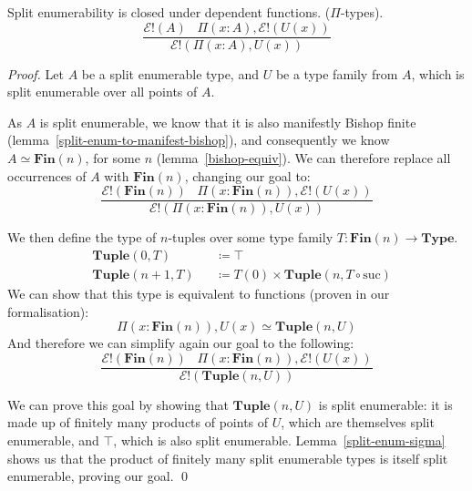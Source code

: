 \begin{romlemma}
  Split enumerability is closed under dependent functions.
  (\(\Pi\)-types).
  \begin{equation}
    \frac{
      \mathcal{E}!(A) \; \; \; \Pi {(x : A)} , \mathcal{E}!\left( U(x) \right)
    }{
      \mathcal{E}!\left(\Pi {(x : A)} , U(x)\right)
    }
  \end{equation}
\end{romlemma}
\begin{proof}
  Let \(A\) be a split enumerable type, and \(U\) be a type family from \(A\),
  which is split enumerable over all points of \(A\).

  As \(A\) is split enumerable, we know that it is also manifestly Bishop finite
  (lemma~\ref{split-enum-to-manifest-bishop}), and consequently we know \(A
  \simeq \mathbf{Fin}(n)\), for some \(n\) (lemma~\ref{bishop-equiv}).
  We can therefore replace all occurrences of \(A\) with \(\mathbf{Fin}(n)\),
  changing our goal to:
  \begin{equation}
    \frac{
      \mathcal{E}!(\mathbf{Fin}(n)) \; \; \; \Pi (x : \mathbf{Fin}(n)) , \mathcal{E}!\left( U(x) \right)
    }{
      \mathcal{E}!\left(\Pi (x : \mathbf{Fin}(n)) , U(x)\right)
    }
  \end{equation}
  
  We then define the type of \(n\)-tuples over some type family \(T :
  \mathbf{Fin}(n) \rightarrow \mathbf{Type}\).
  \begin{equation}
    \begin{alignat}{3}
      & \mathbf{Tuple}(0, T)   &&\coloneqq \top \\
      & \mathbf{Tuple}(n+1, T) &&\coloneqq T(0) \times \mathbf{Tuple}(n, T \circ \text{suc})
    \end{alignat}
  \end{equation}
  We can show that this type is equivalent to functions (proven in our formalisation):
  \begin{equation}
    \Pi(x : \mathbf{Fin}(n)) , U(x) \simeq \mathbf{Tuple}(n, U)
  \end{equation}
  And therefore we can simplify again our goal to the following:
  \begin{equation}
    \frac{
      \mathcal{E}!(\mathbf{Fin}(n)) \; \; \; \Pi (x : \mathbf{Fin}(n)) , \mathcal{E}!\left( U(x) \right)
    }{
      \mathcal{E}!\left(\mathbf{Tuple}(n, U)\right)
    }
  \end{equation}
  
  We can prove this goal by showing that \(\mathbf{Tuple}(n, U)\) is split
  enumerable: it is made up of finitely many products of points of \(U\), which
  are themselves split enumerable, and \(\top\), which is also split enumerable.
  Lemma~\ref{split-enum-sigma} shows us that the product of finitely many split
  enumerable types is itself split enumerable, proving our goal.
  \qed
\end{proof}

